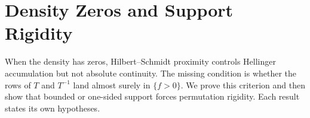 \section{Density Zeros and Support Rigidity}
\label{sec:zero-set-row-condition-and-support-geometry}

When the density has zeros, Hilbert--Schmidt proximity controls Hellinger
accumulation but not absolute continuity.  The missing condition is whether
the rows of \(T\) and \(T^{-1}\) land almost surely in \(\{f>0\}\).  We prove
this criterion and then show that bounded or one-sided support forces
permutation rigidity.  Each result states its own hypotheses.



